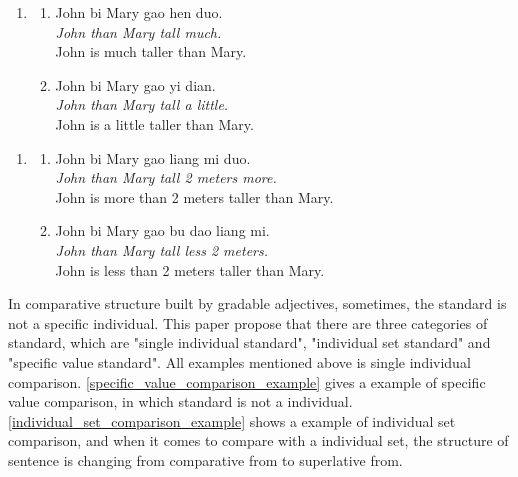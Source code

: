\documentclass{ctexart}
\begin{document}
\begin{enumerate}[resume]
    \item
    \begin{enumerate}[ref=(\arabic{enumi}\alph*)]
        \item \label{dp_big_vague_example}
        John bi Mary gao hen duo.\\
        \textit{John than Mary tall much.} \\
        John is much taller than Mary.

        \item \label{dp_small_vague_example}
        John bi Mary gao yi dian.\\
        \textit{John than Mary tall a little.}\\
        John is a little taller than Mary.

    \end{enumerate}
\end{enumerate}

\begin{enumerate}[resume]
    \item
    \begin{enumerate}[ref=(\arabic{enumi}\alph*)]
        \item \label{dp_value_big_vague_example}
        John bi Mary gao liang mi duo.\\
        \textit{John than Mary tall 2 meters more.} \\
        John is more than 2 meters taller than Mary.

        \item \label{dp_value_small_vague_example}
        John bi Mary gao bu dao liang mi.\\
        \textit{John than Mary tall less 2 meters.} \\
        John is less than 2 meters taller than Mary.
    \end{enumerate}
\end{enumerate}

In comparative structure built by gradable adjectives, sometimes, the standard is not a specific individual. This paper propose that there are three categories of standard, which are "single individual standard", "individual set standard" and "specific value standard". All examples mentioned above is single individual comparison. \ref{specific_value_comparison_example} gives a example of specific value comparison, in which standard is not a individual. \ref{individual_set_comparison_example} shows a example of individual set comparison, and when it comes to compare with a individual set, the structure of sentence is changing from comparative from to superlative from.
\end{document}
